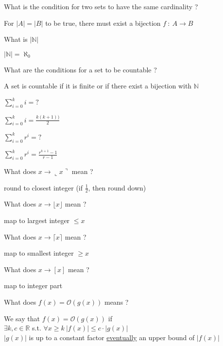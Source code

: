 \documentclass[12pt]{article}
\newcommand*{\xfield}[1]{\begin{mdframed}\centering #1\end{mdframed}\bigskip}
\newenvironment{note}{}{}
\begin{document}
\begin{note}
    \xfield{What is the condition for two sets to have the same cardinality ?}
    \xfield{For $\left\vert A \right\vert = \left\vert B \right\vert $ to be true, there must exist a bijection $f\ :\ A \to B$ }
\end{note}

\begin{note}
    \xfield{What is $\left\vert \mathbb{N} \right\vert$}
    \xfield{ $\left\vert \mathbb{N} \right\vert =  \aleph_0$}
\end{note}

\begin{note}
    \xfield{What are the conditions for a set to be countable ?}
    \xfield{A set is countable if it is finite or if there exist a bijection with $\mathbb{N}$}
\end{note}

\begin{note}
    \xfield{$\sum_{i=0}^{k} i = ?$}
    \xfield{$\sum_{i=0}^{k} i = \frac{k(k+1))}{2}$}
\end{note}

\begin{note}
    \xfield{$\sum_{i=0}^{k} r^i = ?$}
    \xfield{$\sum_{i=0}^{k} r^i = \frac{r^{k+1} - 1}{r - 1}$}
\end{note}

\begin{note}
    \xfield{What does $x \to \llcorner x \urcorner$ mean ?}
    \xfield{round to closest integer (if $\frac{1}{2}$, then round down)}
\end{note}

\begin{note}
    \xfield{What does $x \to \lfloor x \rfloor$ mean ?}
    \xfield{map to largest integer $\le x$}
\end{note}

\begin{note}
    \xfield{What does $x \to \lceil x \rceil$ mean ?}
    \xfield{map to smallest integer $\ge x$}
\end{note}

\begin{note}
    \xfield{What does $x \to [ x]$ mean ?}
    \xfield{map to integer part}
\end{note}

\begin{note}
    \xfield{What does $f(x) = \mathcal{O}(g(x))$ means ?}
    \xfield{
        We say that  $f(x) = \mathcal{O}(g(x))$ if \\
        $\exists k,c \in \mathbb{R}$ s.t. $\forall x \ge k\ \left\vert f(x)\right\vert \le c \cdot \left\vert g(x)\right\vert $ \\
        $\left\vert g(x)\right\vert$ is up to a constant factor \underline{eventually} an upper bound of $\left\vert f(x)\right\vert $
    }
\end{note}
\end{document}
